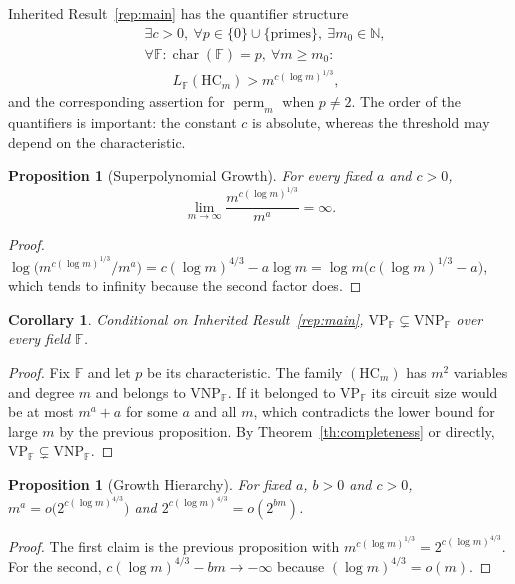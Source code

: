\documentclass[11pt,letterpaper]{report}
\theoremstyle{plain}
\newtheorem{proposition}[theorem]{Proposition}
\newtheorem{corollary}[theorem]{Corollary}
\theoremstyle{definition}
\theoremstyle{remark}
\DeclareMathOperator{\perm}{perm}
\newcommand{\VP}{\mathrm{VP}}
\newcommand{\VNP}{\mathrm{VNP}}
\begin{document}
Inherited Result~\ref{rep:main} has the quantifier structure
\[
\begin{aligned}
&\exists c>0,\ \forall p\in\{0\}\cup\{\text{primes}\},\ \exists m_0\in\mathbb N,\\
&\forall\mathbb F:\operatorname{char}(\mathbb F)=p,\ \forall m\ge m_0:\\
&\qquad L_{\mathbb F}(\mathrm{HC}_m)>m^{c(\log m)^{1/3}},
\end{aligned}
\]
and the corresponding assertion for $\perm_m$ when $p\ne2$. The order of the quantifiers is important: the constant $c$ is absolute, whereas the threshold may depend on the characteristic.

\begin{proposition}[Superpolynomial Growth]
For every fixed $a$ and $c>0$,
\[
\lim_{m\to\infty}\frac{m^{c(\log m)^{1/3}}}{m^{a}}=\infty.
\]
\end{proposition}
\begin{proof}
$\log\bigl(m^{c(\log m)^{1/3}}/m^{a}\bigr)=c(\log m)^{4/3}-a\log m=\log m\bigl(c(\log m)^{1/3}-a\bigr)$, which tends to infinity because the second factor does.
\end{proof}

\begin{corollary}
Conditional on Inherited Result~\ref{rep:main}, $\VP_{\mathbb F}\subsetneq\VNP_{\mathbb F}$ over every field $\mathbb F$.
\end{corollary}
\begin{proof}
Fix $\mathbb F$ and let $p$ be its characteristic. The family $(\mathrm{HC}_m)$ has $m^2$ variables and degree $m$ and belongs to $\VNP_{\mathbb F}$. If it belonged to $\VP_{\mathbb F}$ its circuit size would be at most $m^a+a$ for some $a$ and all $m$, which contradicts the lower bound for large $m$ by the previous proposition. By Theorem~\ref{th:completeness} or directly, $\VP_{\mathbb F}\subsetneq\VNP_{\mathbb F}$.
\end{proof}

\begin{proposition}[Growth Hierarchy]
For fixed $a$, $b>0$ and $c>0$, $m^{a}=o\bigl(2^{c(\log m)^{4/3}}\bigr)$ and $2^{c(\log m)^{4/3}}=o(2^{bm})$.
\end{proposition}
\begin{proof}
The first claim is the previous proposition with $m^{c(\log m)^{1/3}}=2^{c(\log m)^{4/3}}$. For the second, $c(\log m)^{4/3}-bm\to-\infty$ because $(\log m)^{4/3}=o(m)$.
\end{proof}
\end{document}
